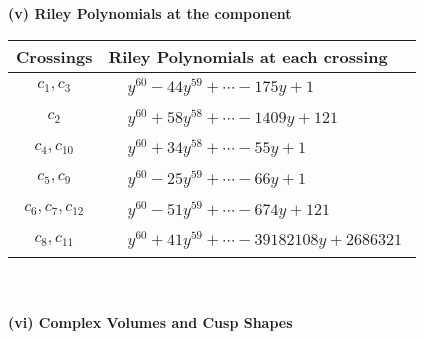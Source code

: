 \documentclass[1p]{elsarticle_modified}
\theoremstyle{definition}
\begin{document}
\newpage\renewcommand{\arraystretch}{1}
\flushleft \textbf{(v) Riley Polynomials at the component}\newline \\
\begin{tabular}{m{50pt}|m{274pt}}
Crossings & \hspace{64pt}Riley Polynomials at each crossing \\
\hline $$\begin{aligned}c_{1},c_{3}\end{aligned}$$&$\begin{aligned}
&y^{60}-44 y^{59}+\cdots-175 y+1
\end{aligned}$\\
\hline $$\begin{aligned}c_{2}\end{aligned}$$&$\begin{aligned}
&y^{60}+58 y^{58}+\cdots-1409 y+121
\end{aligned}$\\
\hline $$\begin{aligned}c_{4},c_{10}\end{aligned}$$&$\begin{aligned}
&y^{60}+34 y^{58}+\cdots-55 y+1
\end{aligned}$\\
\hline $$\begin{aligned}c_{5},c_{9}\end{aligned}$$&$\begin{aligned}
&y^{60}-25 y^{59}+\cdots-66 y+1
\end{aligned}$\\
\hline $$\begin{aligned}c_{6},c_{7},c_{12}\end{aligned}$$&$\begin{aligned}
&y^{60}-51 y^{59}+\cdots-674 y+121
\end{aligned}$\\
\hline $$\begin{aligned}c_{8},c_{11}\end{aligned}$$&$\begin{aligned}
&y^{60}+41 y^{59}+\cdots-39182108 y+2686321
\end{aligned}$\\
\hline
\end{tabular}\\~\\
\newpage\flushleft \textbf{(vi) Complex Volumes and Cusp Shapes}
\end{document}
